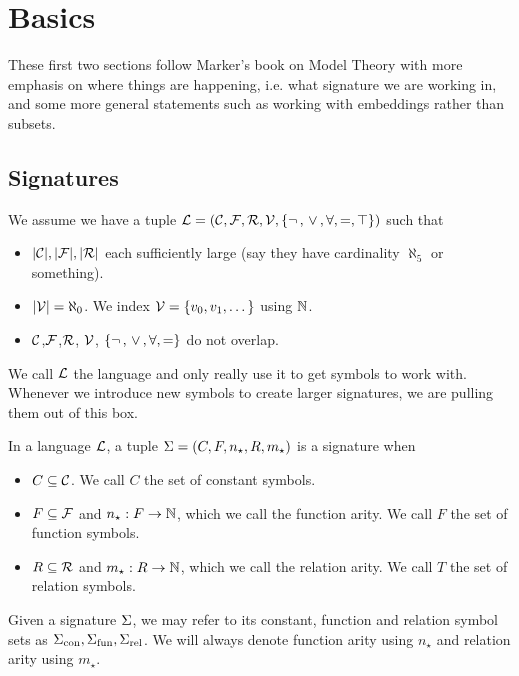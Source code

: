 \section{Basics}
These first two sections follow Marker's book on Model Theory 
\cite{marker} with more 
emphasis on where things are happening, i.e. what signature we are working in,
and some more general statements such as working with embeddings rather than 
subsets.

\subsection{Signatures}
\begin{dfn}
    We assume we have a tuple
    $\mathcal{L} = (\mathcal{C},\mathcal{F},\mathcal{R},\mathcal{V},\left\{\neg\,,\, \lor \,,\forall,=,\top\right\})$ such that 
    \begin{itemize}
        \item $|\mathcal{C}|,|\mathcal{F}|,|\mathcal{R}|$ each sufficiently large 
            (say they have cardinality $\aleph_5$ or something).
        \item $|\mathcal{V}| = \aleph_0$. 
            We index $\mathcal{V} = \left\{v_0, v_1, \dots \right\}$ using $\mathbb{N}$.
        \item $\mathcal{C}$,$\mathcal{F}$,$\mathcal{R}$, $\mathcal{V}$, $\left\{\neg\,,\, \lor \,,\forall,=\right\}$ 
            do not overlap.
    \end{itemize}
    We call $\mathcal{L}$ the language and only really 
    use it to get symbols to work with.
    Whenever we introduce new symbols to create larger signatures, 
    we are pulling them out of this box.
\end{dfn}

\begin{dfn}[Signature]
    In a language $\mathcal{L}$, 
    a tuple $\Sigma = (C,F,n_\star ,R, m_\star)$ is a signature when 
    \begin{itemize}
        \item $C \subseteq \mathcal{C}$. 
            We call $C$ the set of constant symbols.
        \item $F \subseteq \mathcal{F}$ and 
            $n_{\star} : F \to \mathbb{N}$, 
            which we call the function arity. 
            We call $F$ the set of function symbols.
        \item $R \subseteq \mathcal{R}$
            and $m_{\star} : R \to \mathbb{N}$,
            which we call the relation arity.
            We call $T$ the set of relation symbols.
    \end{itemize}
    Given a signature $\Sigma$, we may refer to its constant, 
    function and relation symbol sets as ${\Sigma}_\mathrm{con},{\Sigma}_\mathrm{fun},{\Sigma}_\mathrm{rel}$.
    We will always denote function arity using $n_\star$ 
    and relation arity using $m_\star$.
\end{dfn}

